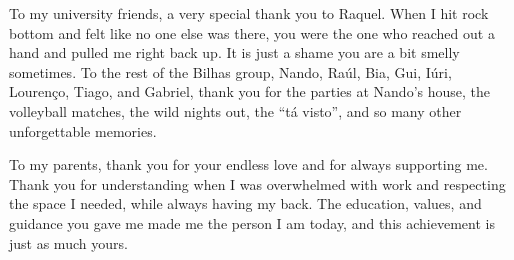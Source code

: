 \begin{ntacknowledgements}
To my university friends, a very special thank you to Raquel. When I hit rock bottom and felt like no one else was there, you were the one who reached out a hand and pulled me right back up. It is just a shame you are a bit smelly sometimes. To the rest of the Bilhas group, Nando, Raúl, Bia, Gui, Iúri, Lourenço, Tiago, and Gabriel, thank you for the parties at Nando's house, the volleyball matches, the wild nights out, the ``tá visto'', and so many other unforgettable memories.

To my parents, thank you for your endless love and for always supporting me. Thank you for understanding when I was overwhelmed with work and respecting the space I needed, while always having my back. The education, values, and guidance you gave me made me the person I am today, and this achievement is just as much yours.

\end{ntacknowledgements}